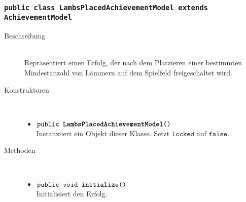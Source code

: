 \subsubsection{\normalfont \texttt{public class \textbf{LambsPlacedAchievementModel} extends AchievementModel}}

\begin{description}
\item[Beschreibung] \hfill \\ Repräsentiert einen Erfolg, der nach dem Platzieren einer bestimmten Mindestanzahl von Lämmern auf dem Spielfeld freigeschaltet wird.
	
\item[Konstruktoren] \hfill \\
	\vspace{-.8cm}
	\begin{itemize}
		\item $\texttt{public \textbf{LambsPlacedAchievementModel}()}$ \\ Instanziiert ein Objekt dieser Klasse. Setzt $\texttt{locked}$ auf $\texttt{false}$.
	\end{itemize}
	
\item[Methoden] \hfill \\
	\vspace{-.8cm}
	\begin{itemize}
		\item $\texttt{public void \textbf{initialize}()}$ \\ Initialisiert den Erfolg.
		

\end{itemize}
\end{description}
